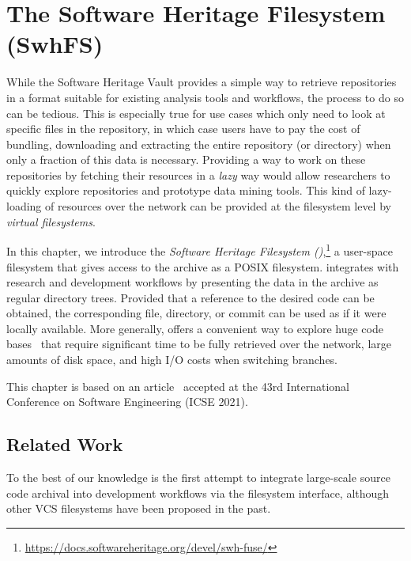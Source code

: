 \chapter{The Software Heritage Filesystem (SwhFS)}
\label{chp:fuse}

While the Software Heritage Vault provides a simple way to retrieve
repositories in a format suitable for existing analysis tools and workflows,
the process to do so can be tedious. This is especially true for use cases
which only need to look at specific files in the repository, in which case
users have to pay the cost of bundling, downloading and extracting the entire
repository (or directory) when only a fraction of this data is necessary.
Providing a way to work on these repositories by fetching their resources in a
\emph{lazy} way would allow researchers to quickly explore repositories and
prototype data mining tools. This kind of lazy-loading of resources over the
network can be provided at the filesystem level by \emph{virtual filesystems}.

In this chapter, we introduce the \emph{Software Heritage Filesystem
  (\SWHFS)},\footnote{\url{https://docs.softwareheritage.org/devel/swh-fuse/}}
  a user-space filesystem that gives access to the \SWH{} archive as a POSIX
  filesystem. \SWHFS{} integrates with research and development workflows by
presenting the data in the archive as regular directory trees.
Provided that a reference to the desired code can be obtained, the
corresponding file, directory, or commit can be used as if it were locally
available. More generally, \SWHFS{} offers a convenient way to explore huge
code bases~\cite{msscalar, msvfsforgit} that require significant time to be
fully retrieved over the network, large amounts of disk space, and high I/O
costs when switching branches.

\vspace{0.5cm}

This chapter is based on an article~\cite{swh-2021-swhfs}
accepted at the 43rd International Conference on Software Engineering (ICSE
2021).



\section{Related Work}

To the best of our knowledge \SWHFS{} is the first attempt to integrate
large-scale source code archival into development workflows via the filesystem
interface, although other VCS filesystems have been proposed in the past.

